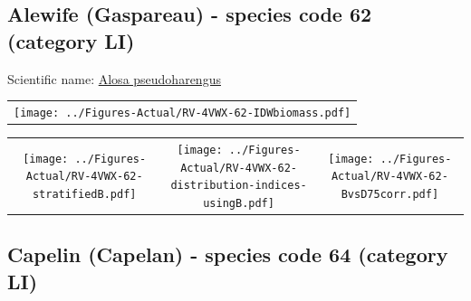 \documentclass[12pt]{article}\usepackage[]{graphicx}\usepackage[]{color}
\begin{document}
\renewcommand\thefigure{\thesubsection\Alph{figure}}

\setcounter{figure}{0}

\hypertarget{sec:62}{%
\subsection{Alewife (Gaspareau) - species code 62 (category LI)}\label{sec:62}}

  


Scientific name: \href{http://www.marinespecies.org/aphia.php?p=taxdetails\&id=158669}{Alosa pseudoharengus} \newline
\begin{minipage}{1.0\textwidth}
 \begin{tabular}{c}
\texttt{[image: ../Figures-Actual/RV-4VWX-62-IDWbiomass.pdf]} \\ 
\end{tabular} 
\end{minipage}
\newline

\vspace{1cm}
\begin{minipage}{1.0\textwidth}
 \begin{tabular}{ccc}
\texttt{[image: ../Figures-Actual/RV-4VWX-62-stratifiedB.pdf]} & 
\texttt{[image: ../Figures-Actual/RV-4VWX-62-distribution-indices-usingB.pdf]} & 
\texttt{[image: ../Figures-Actual/RV-4VWX-62-BvsD75corr.pdf]} \\ 
\end{tabular} 
\end{minipage}
\clearpage

\renewcommand\thefigure{\thesubsection\Alph{figure}}

\setcounter{figure}{0}

\hypertarget{sec:64}{%
\subsection{Capelin (Capelan) - species code 64 (category LI)}\label{sec:64}}

  
\end{document}
